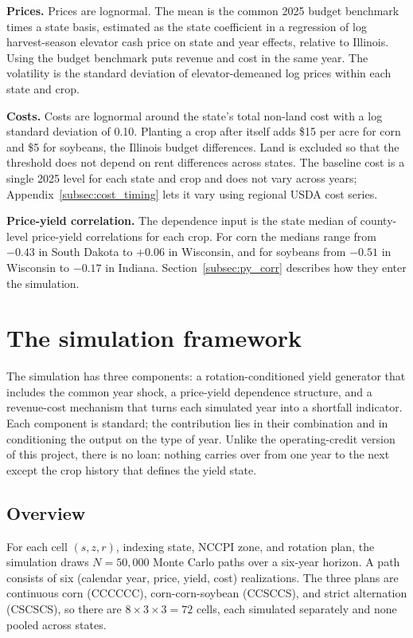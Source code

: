 \documentclass[11pt,letterpaper]{article}
\theoremstyle{remark}
\begin{document}
\textbf{Prices.} Prices are lognormal. The mean is the common 2025 budget benchmark times a state basis, estimated as the state coefficient in a regression of log harvest-season elevator cash price on state and year effects, relative to Illinois. Using the budget benchmark puts revenue and cost in the same year. The volatility is the standard deviation of elevator-demeaned log prices within each state and crop.

\textbf{Costs.} Costs are lognormal around the state's total non-land cost with a log standard deviation of 0.10. Planting a crop after itself adds \$15 per acre for corn and \$5 for soybeans, the Illinois budget differences. Land is excluded so that the threshold does not depend on rent differences across states. The baseline cost is a single 2025 level for each state and crop and does not vary across years; Appendix~\ref{subsec:cost_timing} lets it vary using regional USDA cost series.

\textbf{Price-yield correlation.} The dependence input is the state median of county-level price-yield correlations for each crop. For corn the medians range from $-0.43$ in South Dakota to $+0.06$ in Wisconsin, and for soybeans from $-0.51$ in Wisconsin to $-0.17$ in Indiana. Section~\ref{subsec:py_corr} describes how they enter the simulation.

\section{\label{sec:simulation}The simulation framework}

The simulation has three components: a rotation-conditioned yield generator that includes the common year shock, a price-yield dependence structure, and a revenue-cost mechanism that turns each simulated year into a shortfall indicator. Each component is standard; the contribution lies in their combination and in conditioning the output on the type of year. Unlike the operating-credit version of this project, there is no loan: nothing carries over from one year to the next except the crop history that defines the yield state.

\subsection{\label{subsec:overview}Overview}

For each cell $(s,z,r)$, indexing state, NCCPI zone, and rotation plan, the simulation draws $N = 50{,}000$ Monte Carlo paths over a six-year horizon. A path consists of six (calendar year, price, yield, cost) realizations. The three plans are continuous corn (CCCCCC), corn-corn-soybean (CCSCCS), and strict alternation (CSCSCS), so there are $8 \times 3 \times 3 = 72$ cells, each simulated separately and none pooled across states.
\end{document}
